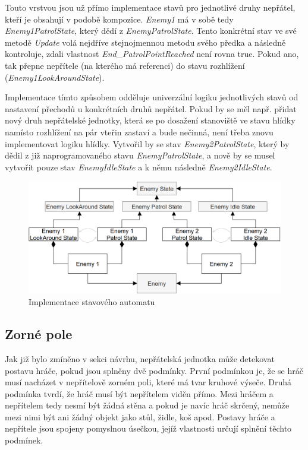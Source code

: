 \documentclass[FM,Proj]{tulthesis}
\begin{document}
	Touto vrstvou jsou už přímo implementace stavů pro jednotlivé druhy nepřátel, kteří je obsahují v podobě kompozice. \textit{Enemy1} má v sobě tedy \textit{Enemy1PatrolState}, který dědí z \textit{EnemyPatrolState}. Tento konkrétní stav ve své metodě \textit{Update} volá nejdříve stejnojmennou metodu svého předka a následně kontroluje, zdali vlastnost \textit{End\_PatrolPointReached} není rovna true. Pokud ano, tak přepne nepřítele (na kterého má referenci) do stavu rozhlížení (\textit{Enemy1LookAroundState}).
	
	Implementace tímto způsobem odděluje univerzální logiku jednotlivých stavů od nastavení přechodů u konkrétních druhů nepřátel. Pokud by se měl např. přidat nový druh nepřátelské jednotky, která se po dosažení stanoviště ve stavu hlídky namísto rozhlížení na pár vteřin zastaví a bude nečinná, není třeba znovu implementovat logiku hlídky. Vytvořil by se stav \textit{Enemy2PatrolState}, který by dědil z již naprogramovaného stavu \textit{EnemyPatrolState}, a nově by se musel vytvořit pouze stav \textit{EnemyIdleState} a k němu následně \textit{Enemy2IdleState}.
		 
	\begin{figure}[ht]
		\centering
		\includegraphics[width=\textwidth]{img/FSM_Specific}
		\caption{Implementace stavového automatu}		
	\end{figure}
		 
	\subsection{Zorné pole}
	
	Jak již bylo zmíněno v sekci návrhu, nepřátelská jednotka může detekovat postavu hráče, pokud jsou splněny dvě podmínky. První podmínkou je, že se hráč musí nacházet v nepřítelově zorném poli, které má tvar kruhové výseče. Druhá podmínka tvrdí, že hráč musí být nepřítelem viděn přímo. Mezi hráčem a nepřítelem tedy nesmí být žádná stěna a pokud je navíc hráč skrčený, nemůže mezi nimi být ani žádný objekt jako stůl, židle, koš apod. Postavy hráče a nepřítele jsou spojeny pomyslnou úsečkou, jejíž vlastnosti určují splnění těchto podmínek.
	
\end{document}
